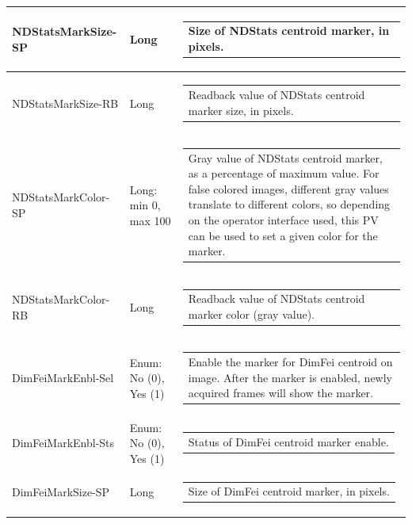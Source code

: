 \documentclass[openany]{article}
\begin{document}
\begin{longtable}{| m{3.0cm} m{4.5cm}  m{7.0cm} |}
        NDStatsMarkSize-SP & Long & \begin{tabular}{@{}m{6cm}@{}}
                Size of NDStats centroid marker, in pixels.
            \end{tabular} \\ \hline
        NDStatsMarkSize-RB & Long & \begin{tabular}{@{}m{6cm}@{}}
                Readback value of NDStats centroid marker size, in pixels.
            \end{tabular} \hypertarget{pv:ndstats-mark-color}{}\\ \hline
        NDStatsMarkColor-SP & Long: min 0, max 100 & \begin{tabular}{@{}m{6cm}@{}}
                Gray value of NDStats centroid marker, as a percentage of maximum value. For false colored images,
                different gray values translate to different colors, so depending
                on the operator interface used, this PV can be used to set a given
                color for the marker.
            \end{tabular} \\ \hline
        NDStatsMarkColor-RB & Long & \begin{tabular}{@{}m{6cm}@{}}
                Readback value of NDStats centroid marker color (gray value).
            \end{tabular} \hypertarget{pv:dimfei-mark-enbl}{}\\ \hline
        DimFeiMarkEnbl-Sel & Enum: No (0), Yes (1) & \begin{tabular}{@{}m{6cm}@{}}
                Enable the marker for DimFei centroid on image. After the marker
                is enabled, newly acquired frames will show the marker.
            \end{tabular} \\ \hline
        DimFeiMarkEnbl-Sts & Enum: No (0), Yes (1) & \begin{tabular}{@{}m{6cm}@{}}
                Status of DimFei centroid marker enable.
            \end{tabular} \hypertarget{pv:dimfei-mark-size}{}\\ \hline
        DimFeiMarkSize-SP & Long & \begin{tabular}{@{}m{6cm}@{}}
                Size of DimFei centroid marker, in pixels.
            \end{tabular} \\ \hline

\end{longtable}
\end{document}
